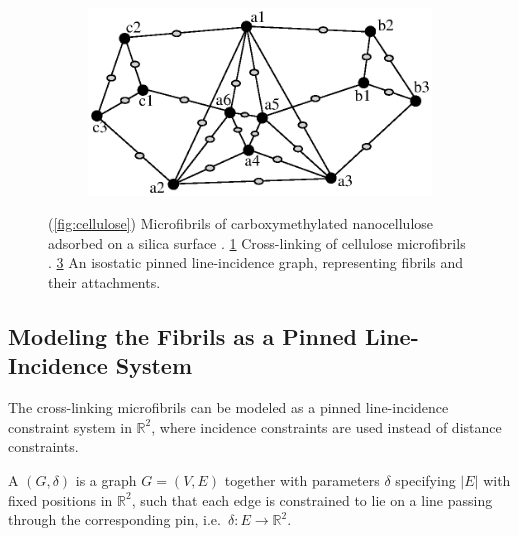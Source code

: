 \begin{figure}
\begin{subfigure}{0.32\linewidth}
    \caption{}\label{fig:crosslink}
\end{subfigure}\hfill%
\begin{subfigure}{0.32\linewidth}\centering
    \includegraphics[height=\myMinHeight]{../../img/pinned}
    \caption{}
    \label{fig:pinned_line}
\end{subfigure}%
\caption{(\ref{fig:cellulose}) Microfibrils of carboxymethylated nanocellulose adsorbed on a silica surface \cite{wikimediacommons2010afm}. \ref{fig:crosslink} Cross-linking of cellulose microfibrils \cite{wikimediacommons2007plant}. \ref{fig:pinned_line} An isostatic pinned line-incidence graph, representing fibrils and their attachments.}
\end{figure}%



\subsection{Modeling the Fibrils as a Pinned Line-Incidence System}



The cross-linking microfibrils can be modeled as a pinned line-incidence constraint system in $\mathbb{R}^2$, where incidence constraints are used instead of distance constraints.

\begin{definition}
    A  $(G,\delta)$ is a graph $G=(V,E)$ together with parameters $\delta$ specifying $|E|$  with fixed positions in $\mathbb{R}^2$, such that each edge is constrained to lie on a line passing through the corresponding pin, i.e.\ $\delta: E \rightarrow \mathbb{R}^2$.
\end{definition}


